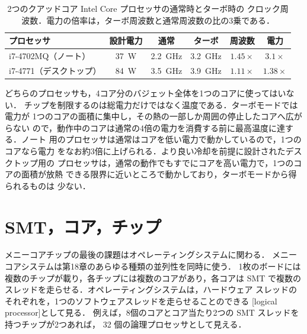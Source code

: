 \documentclass[../main.tex]{subfiles}
\begin{document}
\begin{table}[htbp]
  \centering\small
  \caption{2つのクアッドコア Intel Core プロセッサの通常時とターボ時の
    クロック周波数．電力の倍率は，ターボ周波数と通常周波数の比の3乗である．}
  \label{tab:l22-turbo}
  \begin{tabular}{@{}lccccc@{}}
    \toprule
    プロセッサ & 設計電力 & 通常 & ターボ & 周波数 & 電力 \\
    \midrule
    i7-4702MQ（ノート） & \SI{37}{W} & \SI{2.2}{GHz} & \SI{3.2}{GHz} & $1.45\times$ & $3.1\times$ \\
    i7-4771（デスクトップ） & \SI{84}{W} & \SI{3.5}{GHz} & \SI{3.9}{GHz} & $1.11\times$ & $1.38\times$ \\
    \bottomrule
  \end{tabular}
\end{table}

どちらのプロセッサも，4コア分のバジェット全体を1つのコアに使ってはいない．
チップを制限するのは総電力だけではなく温度である．ターボモードでは電力が
1つのコアの面積に集中し，その熱の一部しか周囲の停止したコアへ広がらない
ので，動作中のコアは通常の4倍の電力を消費する前に最高温度に達する．ノート
用のプロセッサは通常はコアを低い電力で動かしているので，1つのコアなら電力
をなお約3倍に上げられる．より良い冷却を前提に設計されたデスクトップ用の
プロセッサは，通常の動作でもすでにコアを高い電力で，1つのコアの面積が放熱
できる限界に近いところで動かしており，ターボモードから得られるものは
少ない．

\section{SMT，コア，チップ}
\label{sec:l22-os}

メニーコアチップの最後の課題はオペレーティングシステムに関わる．
メニーコアシステムは第18章のあらゆる種類の並列性を同時に使う．
1枚のボードには複数のチップが載り，各チップには複数のコアがあり，各コアは
SMT で複数のスレッドを走らせる．オペレーティングシステムは，ハードウェア
スレッドのそれぞれを，1つのソフトウェアスレッドを走らせることのできる
[logical processor]として見る．
例えば，8個のコアとコア当たり2つの SMT スレッドを持つチップが2つあれば，
32 個の論理プロセッサとして見える．
\end{document}

